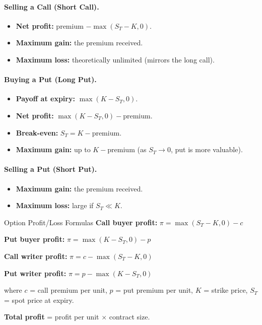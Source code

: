 \documentclass[11pt,a4paper]{article}
\begin{document}
\paragraph{Selling a Call (Short Call).}
\begin{itemize}
  \item \textbf{Net profit:} premium $- \max(S_T - K, 0)$.
  \item \textbf{Maximum gain:} the premium received.
  \item \textbf{Maximum loss:} theoretically unlimited (mirrors the long call).
\end{itemize}

\paragraph{Buying a Put (Long Put).}
\begin{itemize}
  \item \textbf{Payoff at expiry:} $\max(K - S_T, 0)$.
  \item \textbf{Net profit:} $\max(K - S_T, 0) - \text{premium}$.
  \item \textbf{Break-even:} $S_T = K - \text{premium}$.
  \item \textbf{Maximum gain:} up to $K - \text{premium}$ (as $S_T \to 0$, put is more valuable).
\end{itemize}

\paragraph{Selling a Put (Short Put).}
\begin{itemize}
  \item \textbf{Maximum gain:} the premium received.
  \item \textbf{Maximum loss:} large if $S_T \ll K$.
\end{itemize}

\begin{formulabox}{Option Profit/Loss Formulas}
\textbf{Call buyer profit:} $\pi = \max(S_T - K, 0) - c$

\textbf{Put buyer profit:} $\pi = \max(K - S_T, 0) - p$

\textbf{Call writer profit:} $\pi = c - \max(S_T - K, 0)$

\textbf{Put writer profit:} $\pi = p - \max(K - S_T, 0)$

where $c$ = call premium per unit, $p$ = put premium per unit, $K$ = strike price, $S_T$ = spot price at expiry.

\textbf{Total profit} = profit per unit $\times$ contract size.
\end{formulabox}
\end{document}
